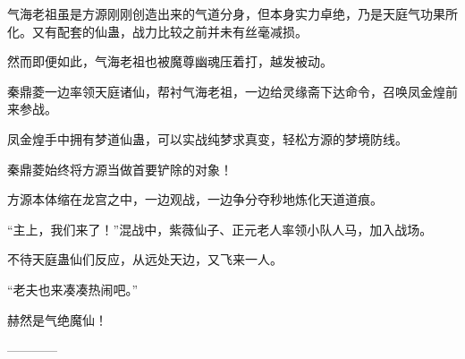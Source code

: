 \begin{this_body}
气海老祖虽是方源刚刚创造出来的气道分身，但本身实力卓绝，乃是天庭气功果所化。又有配套的仙蛊，战力比较之前并未有丝毫减损。

然而即便如此，气海老祖也被魔尊幽魂压着打，越发被动。

秦鼎菱一边率领天庭诸仙，帮衬气海老祖，一边给灵缘斋下达命令，召唤凤金煌前来参战。

凤金煌手中拥有梦道仙蛊，可以实战纯梦求真变，轻松方源的梦境防线。

秦鼎菱始终将方源当做首要铲除的对象！

方源本体缩在龙宫之中，一边观战，一边争分夺秒地炼化天道道痕。

“主上，我们来了！”混战中，紫薇仙子、正元老人率领小队人马，加入战场。

不待天庭蛊仙们反应，从远处天边，又飞来一人。

“老夫也来凑凑热闹吧。”

赫然是气绝魔仙！

------------

\end{this_body}

